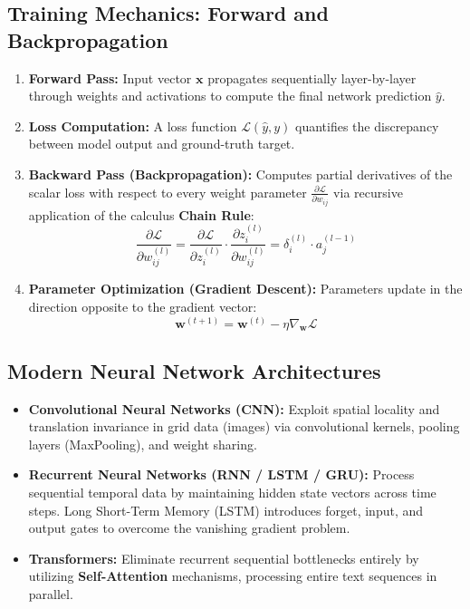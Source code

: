 \subsection{Training Mechanics: Forward and Backpropagation}
\begin{enumerate}
    \item \textbf{Forward Pass:} Input vector $\mathbf{x}$ propagates sequentially layer-by-layer through weights and activations to compute the final network prediction $\hat{y}$.
    \item \textbf{Loss Computation:} A loss function $\mathcal{L}(\hat{y}, y)$ quantifies the discrepancy between model output and ground-truth target.
    \item \textbf{Backward Pass (Backpropagation):} Computes partial derivatives of the scalar loss with respect to every weight parameter $\frac{\partial \mathcal{L}}{\partial w_{ij}}$ via recursive application of the calculus \textbf{Chain Rule}:
    \begin{equation}
    \frac{\partial \mathcal{L}}{\partial w_{ij}^{(l)}} = \frac{\partial \mathcal{L}}{\partial z_i^{(l)}} \cdot \frac{\partial z_i^{(l)}}{\partial w_{ij}^{(l)}} = \delta_i^{(l)} \cdot a_j^{(l-1)}
    \end{equation}
    \item \textbf{Parameter Optimization (Gradient Descent):} Parameters update in the direction opposite to the gradient vector:
    \begin{equation}
    \mathbf{w}^{(t+1)} = \mathbf{w}^{(t)} - \eta \nabla_{\mathbf{w}} \mathcal{L}
    \end{equation}
\end{enumerate}

\subsection{Modern Neural Network Architectures}
\begin{itemize}
    \item \textbf{Convolutional Neural Networks (CNN):} Exploit spatial locality and translation invariance in grid data (images) via convolutional kernels, pooling layers (MaxPooling), and weight sharing.
    \item \textbf{Recurrent Neural Networks (RNN / LSTM / GRU):} Process sequential temporal data by maintaining hidden state vectors across time steps. Long Short-Term Memory (LSTM) introduces forget, input, and output gates to overcome the vanishing gradient problem.
    \item \textbf{Transformers:} Eliminate recurrent sequential bottlenecks entirely by utilizing \textbf{Self-Attention} mechanisms, processing entire text sequences in parallel.
\end{itemize}


